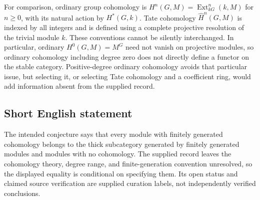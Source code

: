 \documentclass[11pt]{article}
\begin{document}
For comparison, ordinary group cohomology is \(H^n(G,M)=\operatorname{Ext}_{kG}^n(k,M)\) for \(n\geq0\), with its natural action by \(H^*(G,k)\). Tate cohomology \(\widehat H^n(G,M)\) is indexed by all integers and is defined using a complete projective resolution of the trivial module \(k\). These conventions cannot be silently interchanged. In particular, ordinary \(H^0(G,M)=M^G\) need not vanish on projective modules, so ordinary cohomology including degree zero does not directly define a functor on the stable category. Positive-degree ordinary cohomology avoids that particular issue, but selecting it, or selecting Tate cohomology and a coefficient ring, would add information absent from the supplied record.
\subsection{Short English statement}
The intended conjecture says that every module with finitely generated cohomology belongs to the thick subcategory generated by finitely generated modules and modules with no cohomology. The supplied record leaves the cohomology theory, degree range, and finite-generation convention unresolved, so the displayed equality is conditional on specifying them. Its open status and claimed source verification are supplied curation labels, not independently verified conclusions.
\end{document}
